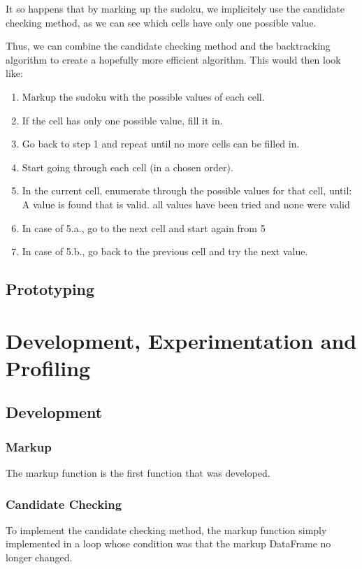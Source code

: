 \documentclass[12pt]{report} %
\begin{document}
It so happens that by marking up the sudoku, we implicitely use the candidate checking method, as we can see which cells have only one possible value.

Thus, we can combine the candidate checking method and the backtracking algorithm to create a hopefully more efficient algorithm. This would then look like:

\begin{enumerate}
  \item Markup the sudoku with the possible values of each cell.
  \item If the cell has only one possible value, fill it in.
  \item Go back to step 1 and repeat until no more cells can be filled in.
  \item Start going through each cell (in a chosen order).
  \item In the current cell, enumerate through the possible values for that cell, until:
   A value is found that is valid.
   all values have been tried and none were valid
  \item In case of 5.a., go to the next cell and start again from 5
  \item In case of 5.b., go back to the previous cell and try the next value.
\end{enumerate}


\section{Prototyping}




\chapter{Development, Experimentation and Profiling}

\section{Development}

\subsection{Markup}
The markup function is the first function that was developed.

\subsection{Candidate Checking}
To implement the candidate checking method, the markup function simply implemented in a loop whose condition was that the markup DataFrame no longer changed.
\end{document}
